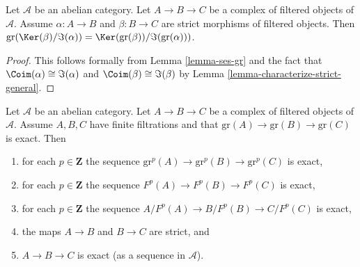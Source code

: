 \begin{lemma}
\label{lemma-filtered-complex}
Let $\mathcal{A}$ be an abelian category. Let $A \to B \to C$ be a complex
of filtered objects of $\mathcal{A}$. Assume $\alpha : A \to B$ and
$\beta : B \to C$ are strict morphisms of filtered objects. Then
$\text{gr}(\Ker(\beta)/\Im(\alpha)) =
\Ker(\text{gr}(\beta))/\Im(\text{gr}(\alpha)))$.
\end{lemma}

\begin{proof}
This follows formally from
Lemma \ref{lemma-ses-gr}
and the fact that
$\Coim(\alpha) \cong \Im(\alpha)$ and
$\Coim(\beta) \cong \Im(\beta)$ by
Lemma \ref{lemma-characterize-strict-general}.
\end{proof}

\begin{lemma}
\label{lemma-filtered-acyclic}
Let $\mathcal{A}$ be an abelian category.
Let $A \to B \to C$ be a complex of filtered objects of $\mathcal{A}$.
Assume $A, B, C$ have finite filtrations and that
$\text{gr}(A) \to \text{gr}(B) \to \text{gr}(C)$ is exact.
Then
\begin{enumerate}
\item for each $p \in \mathbf{Z}$ the sequence
$\text{gr}^p(A) \to \text{gr}^p(B) \to \text{gr}^p(C)$ is exact,
\item for each $p \in \mathbf{Z}$ the sequence
$F^p(A) \to F^p(B) \to F^p(C)$ is exact,
\item for each $p \in \mathbf{Z}$ the sequence
$A/F^p(A) \to B/F^p(B) \to C/F^p(C)$ is exact,
\item the maps $A \to B$ and $B \to C$ are strict, and
\item $A \to B \to C$ is exact (as a sequence in $\mathcal{A}$).
\end{enumerate}
\end{lemma}

